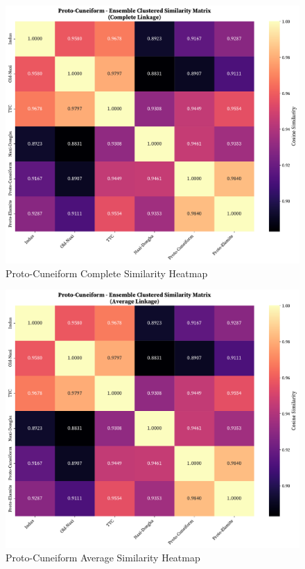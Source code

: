 \documentclass[11pt,a4paper,oneside]{report}
\begin{document}
 \begin{figure}[H]
    \centering
    \includegraphics[width=0.75\linewidth]{Visualizations/Clustered Heatmaps/Proto-Cuneiform/ensemble_clustered_similarity_complete.pdf}
     \caption*{Proto-Cuneiform Complete Similarity Heatmap}
\end{figure}
 \begin{figure}[H]
    \centering
    \includegraphics[width=0.75\linewidth]{Visualizations/Clustered Heatmaps/Proto-Cuneiform/ensemble_clustered_similarity_average.pdf}
     \caption*{Proto-Cuneiform Average Similarity Heatmap}
\end{figure}
\end{document}
